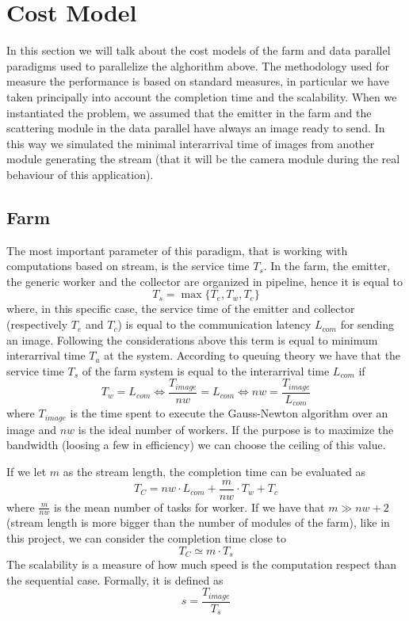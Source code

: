 \section{Cost Model}

In this section we will talk about the cost models of the farm and data parallel paradigms used to parallelize the alghorithm above. The methodology used for measure the performance is based on standard measures, in particular we have taken principally into account the completion time and the scalability. When we instantiated the problem, we assumed that the emitter in the farm and the scattering module in the data parallel have always an image ready to send. In this way we simulated the minimal interarrival time of images from another module generating the stream (that it will be the camera module during the real behaviour of this application).

\subsection{Farm}

The most important parameter of this paradigm, that is working with computations based on stream, is the service time $T_{s}$. In the farm, the emitter, the generic worker and the collector are organized in pipeline, hence it is equal to
\[
T_{s} = \max \lbrace T_{e}, T_{w}, T_{c}\rbrace
\]
where, in this specific case, the service time of the emitter and collector (respectively $T_{e}$ and $T_{c}$) is equal to the communication latency $L_{com}$ for sending an image. Following the considerations above this term is equal to minimum interarrival time $T_{a}$ at the system. According to queuing theory we have that the service time $T_{s}$ of the farm system is equal to the interarrival time $L_{com}$ if
\[
T_{w} = L_{com} \Leftrightarrow \frac{T_{image}}{nw} = L_{com} \Leftrightarrow nw = \frac{T_{image}}{L_{com}} 
\]
where $T_{image}$ is the time spent to execute the Gauss-Newton algorithm over an image and $nw$ is the ideal number of workers. If the purpose is to maximize the bandwidth (loosing a few in efficiency) we can choose the ceiling of this value.

If we let $m$ as the stream length, the completion time can be evaluated as
\[
T_{C} = nw \cdot L_{com} + \frac{m}{nw} \cdot T_{w} + T_{c} 
\]
where $\frac{m}{nw}$ is the mean number of tasks for worker.
If we have that $m \gg nw+2$ (stream length is more bigger than the number of modules of the farm), like in this project, we can consider the completion time close to
\[
T_{C} \simeq m \cdot T_{s}
\]
The scalability is a measure of how much speed is the computation respect than the sequential case. Formally, it is defined as
\[
s = \frac{T_{image}}{T_{s}}
\]
